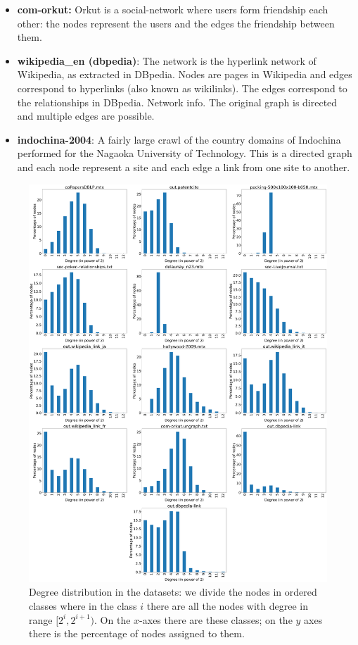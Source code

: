 \begin{itemize}
	\item \textbf{com-orkut:} Orkut is a social-network where users form friendship each other: the nodes represent the users and the edges the friendship between them.
	\item \textbf{wikipedia\_en (dbpedia)}: The network is the hyperlink network of Wikipedia, as extracted in DBpedia. Nodes are pages in Wikipedia and edges correspond to hyperlinks (also known as wikilinks). The edges correspond to the relationships in DBpedia.
	Network info. The original graph is directed and multiple edges are possible.
	\item \textbf{indochina-2004}: A fairly large crawl of the country domains of Indochina performed for the Nagaoka University of Technology. This is a directed graph and each node represent a site and each edge a link from one site to another.
\end{itemize}

\begin{figure}
	\centering
	\includegraphics[width=1\linewidth]{0-resources/dataset-degree-distribution.png}
	\caption{Degree distribution in the datasets: we divide the nodes in ordered classes where in the class $i$ there are all the nodes with degree in range $[2^i, 2^{i+1})$. On the $x$-axes there are these classes; on the $y$ axes there is the percentage of nodes assigned to them.}
	\label{fig:dataset-degree-distribution}
\end{figure}
\newpage

